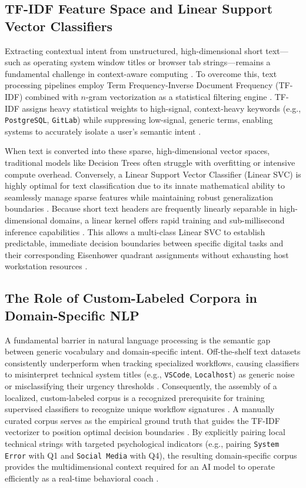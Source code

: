 \documentclass[conference]{IEEEtran}
\begin{document}
\subsection{TF-IDF Feature Space and Linear Support Vector Classifiers}
Extracting contextual intent from unstructured, high-dimensional short text—such as operating system window titles or browser tab strings—remains a fundamental challenge in context-aware computing \cite{Qiao2023}. To overcome this, text processing pipelines employ Term Frequency-Inverse Document Frequency (TF-IDF) combined with $n$-gram vectorization as a statistical filtering engine \cite{Sitaula2022}. TF-IDF assigns heavy statistical weights to high-signal, context-heavy keywords (e.g., \texttt{PostgreSQL}, \texttt{GitLab}) while suppressing low-signal, generic terms, enabling systems to accurately isolate a user's semantic intent \cite{Sitaula2022}.

When text is converted into these sparse, high-dimensional vector spaces, traditional models like Decision Trees often struggle with overfitting or intensive compute overhead. Conversely, a Linear Support Vector Classifier (Linear SVC) is highly optimal for text classification due to its innate mathematical ability to seamlessly manage sparse features while maintaining robust generalization boundaries \cite{Cahyani2021}. Because short text headers are frequently linearly separable in high-dimensional domains, a linear kernel offers rapid training and sub-millisecond inference capabilities \cite{Cahyani2021}. This allows a multi-class Linear SVC to establish predictable, immediate decision boundaries between specific digital tasks and their corresponding Eisenhower quadrant assignments without exhausting host workstation resources \cite{MesaJimenez2022}.

\subsection{The Role of Custom-Labeled Corpora in Domain-Specific NLP}
A fundamental barrier in natural language processing is the semantic gap between generic vocabulary and domain-specific intent. Off-the-shelf text datasets consistently underperform when tracking specialized workflows, causing classifiers to misinterpret technical system titles (e.g., \texttt{VSCode}, \texttt{Localhost}) as generic noise or misclassifying their urgency thresholds \cite{Murrar2025, Allam2025}. Consequently, the assembly of a localized, custom-labeled corpus is a recognized prerequisite for training supervised classifiers to recognize unique workflow signatures \cite{Murrar2025}. A manually curated corpus serves as the empirical ground truth that guides the TF-IDF vectorizer to position optimal decision boundaries \cite{Khan2022}. By explicitly pairing local technical strings with targeted psychological indicators (e.g., pairing \texttt{System Error} with Q1 and \texttt{Social Media} with Q4), the resulting domain-specific corpus provides the multidimensional context required for an AI model to operate efficiently as a real-time behavioral coach \cite{Murrar2025}.
\end{document}

